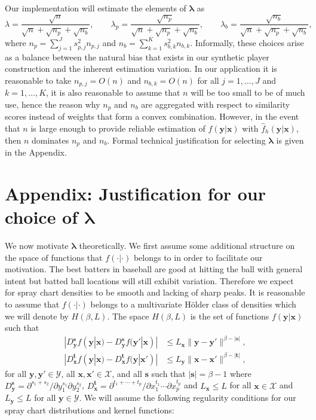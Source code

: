 \documentclass[11pt]{article}
\newcommand{\Y}{\mathcal{Y}}
\newcommand{\X}{\mathcal{X}}
\newcommand{\y}{\textbf{y}}
\newcommand{\x}{\textbf{x}}
\newcommand{\s}{\textbf{s}}
\newcommand{\tbf}{\textbf{t}}
\newcommand{\lambdabf}{\boldsymbol{\lambda}}
\begin{document}
Our implementation will estimate the elements of $\lambdabf$ as 
$$
  \lambda = \frac{\sqrt{n}}{\sqrt{n} + \sqrt{n_p} + \sqrt{n_b}}, \qquad
  \lambda_p = \frac{\sqrt{n_p}}{\sqrt{n} + \sqrt{n_p} + \sqrt{n_b}}, \qquad
  \lambda_b = \frac{\sqrt{n_b}}{\sqrt{n} + \sqrt{n_p} + \sqrt{n_b}},
$$
where $n_p = \sum_{j=1}^J s_{p,j}^2n_{p,j}$ and $n_b = \sum_{k=1}^K s_{b,k}^2n_{b,k}$.  Informally, these choices arise as a balance between the natural bias that exists in our synthetic player construction and the inherent estimation variation. In our application it is reasonable to take $n_{p,j} = O(n)$ and $n_{b,k} = O(n)$ for all $j = 1,\ldots,J$ and $k = 1,\ldots,K$, it is also reasonable to assume  that $n$ will be too small to be of much use, hence the reason why $n_p$ and $n_b$ are aggregated with respect to similarity scores instead of weights that form a convex combination. However, in the event that $n$ is large enough to provide reliable estimation of $f(\y|\x)$ with $\hat f_h(\y|\x)$, then $n$ dominates $n_p$ and $n_b$. Formal technical justification for selecting $\lambdabf$ is given in the Appendix.



\section*{Appendix: Justification for our choice of $\lambdabf$}

We now motivate $\lambdabf$ theoretically. We first assume some additional structure on the space of functions that $f(\cdot|\cdot)$ belongs to in order to facilitate our motivation. The best batters in baseball are good at hitting the ball with general intent but batted ball locations will still exhibit variation. Therefore we expect for spray chart densities to be smooth and lacking of sharp peaks. It is reasonable to assume that $f(\cdot|\cdot)$ belongs to a multivariate H{\"o}lder class of densities which we will denote by $H(\beta,L)$. The space $H(\beta,L)$ is the set of functions $f(\y|\x)$ such that 
\begin{align*}
|D_{\y}^\s f(\y|\x) - D_{\y}^\s f(\y'|\x)| &\leq L_\x\|\y - \y'\|^{\beta - |\s|}, \\
|D_{\x}^\tbf f(\y|\x) - D_{\x}^\tbf f(\y|\x')| &\leq L_\y\|\x - \x'\|^{\beta - |\tbf|}, 
\end{align*}
for all $\y,\y' \in \Y$, all $\x,\x' \in \X$, and all $\s$ such that $|\s| = \beta - 1$ where
$D_{\y}^\s = \partial^{s_1 + s_2}/\partial y_1^{s_1} \partial y_2^{s_2}$, 
$D_{\x}^\tbf = \partial^{t_1 + \cdots + t_p}/\partial x_1^{t_1} \cdots \partial x_p^{t_p}$ and $L_\x \leq L$ for all $\x \in \X$ and $L_\y \leq L$ for all $\y \in \Y$. 
We will assume the following regularity conditions for our spray chart distributions and kernel functions: 
\end{document}
